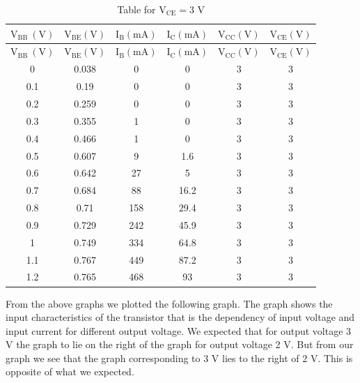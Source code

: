 \documentclass[12pt]{article}
\begin{document}
\begin{longtable}[H]{|c|c|c|c|c|c|}
    \caption{Table for \( \mathrm{V_{CE}} = 3\) V}
    \endfirsthead
    \hline
    $\mathrm{V_{BB} \ (V)}$ & $\mathrm{V_{BE} (V)}$ & $\mathrm{I_B (mA)}$ & $\mathrm{I_C (mA)}$ & $\mathrm{V_{CC} (V)}$ & $\mathrm{V_{CE} (V)}$ \\
    \hline \hline
    \endhead
    \hline
    $\mathrm{V_{BB} \ (V)}$ & $\mathrm{V_{BE} (V)}$ & $\mathrm{I_B (mA)}$ & $\mathrm{I_C (mA)}$ & $\mathrm{V_{CC} (V)}$ & $\mathrm{V_{CE} (V)}$ \\
    \hline \hline
    0     & 0.038 & 0            & 0            & 3     & 3             \\ \hline
    0.1   & 0.19  & 0            & 0            & 3     & 3             \\ \hline
    0.2   & 0.259 & 0            & 0            & 3     & 3             \\ \hline
    0.3   & 0.355 & 1            & 0            & 3     & 3             \\ \hline
    0.4   & 0.466 & 1            & 0            & 3     & 3             \\ \hline
    0.5   & 0.607 & 9            & 1.6          & 3     & 3             \\ \hline
    0.6   & 0.642 & 27           & 5            & 3     & 3             \\ \hline
    0.7   & 0.684 & 88           & 16.2         & 3     & 3             \\ \hline
    0.8   & 0.71  & 158          & 29.4         & 3     & 3             \\ \hline
    0.9   & 0.729 & 242          & 45.9         & 3     & 3             \\ \hline
    1     & 0.749 & 334          & 64.8         & 3     & 3             \\ \hline
    1.1   & 0.767 & 449          & 87.2         & 3     & 3             \\ \hline
    1.2   & 0.765 & 468          & 93           & 3     & 3             \\ \hline           
\end{longtable}

From the above graphs we plotted the following graph. The graph shows the input characteristics of the transistor that is the dependency of input voltage and input current for different output voltage. We expected that for output voltage 3 V the graph to lie on the right of the graph for output voltage 2 V. But from our graph we see that the graph corresponding to 3 V lies to the right of 2 V. This is opposite of what we expected.
\end{document}
